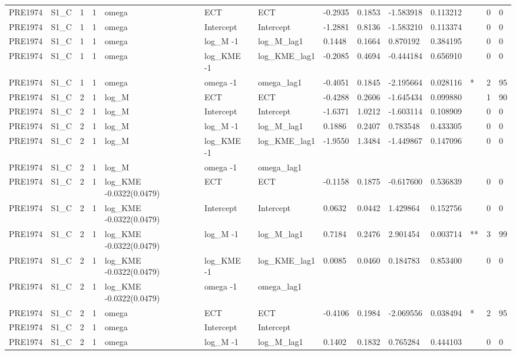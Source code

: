 \begin{tabular}{llllllllllllll}
PRE1974 & S1\_C & 1 & 1 & omega & ECT & ECT & -0.2935 & 0.1853 & -1.583918 & 0.113212 &  & 0 & 0 \\
PRE1974 & S1\_C & 1 & 1 & omega & Intercept & Intercept & -1.2881 & 0.8136 & -1.583210 & 0.113374 &  & 0 & 0 \\
PRE1974 & S1\_C & 1 & 1 & omega & log\_M -1 & log\_M\_lag1 & 0.1448 & 0.1664 & 0.870192 & 0.384195 &  & 0 & 0 \\
PRE1974 & S1\_C & 1 & 1 & omega & log\_KME -1 & log\_KME\_lag1 & -0.2085 & 0.4694 & -0.444184 & 0.656910 &  & 0 & 0 \\
PRE1974 & S1\_C & 1 & 1 & omega & omega -1 & omega\_lag1 & -0.4051 & 0.1845 & -2.195664 & 0.028116 & * & 2 & 95 \\
PRE1974 & S1\_C & 2 & 1 & log\_M & ECT & ECT & -0.4288 & 0.2606 & -1.645434 & 0.099880 &  & 1 & 90 \\
PRE1974 & S1\_C & 2 & 1 & log\_M & Intercept & Intercept & -1.6371 & 1.0212 & -1.603114 & 0.108909 &  & 0 & 0 \\
PRE1974 & S1\_C & 2 & 1 & log\_M & log\_M -1 & log\_M\_lag1 & 0.1886 & 0.2407 & 0.783548 & 0.433305 &  & 0 & 0 \\
PRE1974 & S1\_C & 2 & 1 & log\_M & log\_KME -1 & log\_KME\_lag1 & -1.9550 & 1.3484 & -1.449867 & 0.147096 &  & 0 & 0 \\
PRE1974 & S1\_C & 2 & 1 & log\_M & omega -1 & omega\_lag1 &  &  &  &  &  &  &  \\
PRE1974 & S1\_C & 2 & 1 & log\_KME -0.0322(0.0479) & ECT & ECT & -0.1158 & 0.1875 & -0.617600 & 0.536839 &  & 0 & 0 \\
PRE1974 & S1\_C & 2 & 1 & log\_KME -0.0322(0.0479) & Intercept & Intercept & 0.0632 & 0.0442 & 1.429864 & 0.152756 &  & 0 & 0 \\
PRE1974 & S1\_C & 2 & 1 & log\_KME -0.0322(0.0479) & log\_M -1 & log\_M\_lag1 & 0.7184 & 0.2476 & 2.901454 & 0.003714 & ** & 3 & 99 \\
PRE1974 & S1\_C & 2 & 1 & log\_KME -0.0322(0.0479) & log\_KME -1 & log\_KME\_lag1 & 0.0085 & 0.0460 & 0.184783 & 0.853400 &  & 0 & 0 \\
PRE1974 & S1\_C & 2 & 1 & log\_KME -0.0322(0.0479) & omega -1 & omega\_lag1 &  &  &  &  &  &  &  \\
PRE1974 & S1\_C & 2 & 1 & omega & ECT & ECT & -0.4106 & 0.1984 & -2.069556 & 0.038494 & * & 2 & 95 \\
PRE1974 & S1\_C & 2 & 1 & omega & Intercept & Intercept &  &  &  &  &  &  &  \\
PRE1974 & S1\_C & 2 & 1 & omega & log\_M -1 & log\_M\_lag1 & 0.1402 & 0.1832 & 0.765284 & 0.444103 &  & 0 & 0 \\

\end{tabular}
